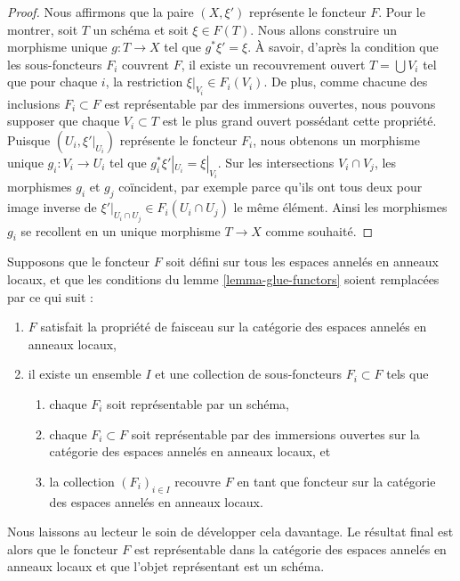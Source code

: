 \begin{proof}
\medskip\noindent
Nous affirmons que la paire $(X, \xi')$ représente le foncteur $F$. Pour
le montrer, soit $T$ un schéma et soit $\xi \in F(T)$. Nous
allons construire un morphisme unique $g : T \to X$ tel que $g^*\xi'
= \xi$. À savoir, d’après la condition que les sous-foncteurs $F_i$
couvrent $F$, il existe un recouvrement ouvert $T = \bigcup V_i$ tel que
pour chaque $i$, la restriction $\xi|_{V_i} \in F_i(V_i)$. De plus, comme
chacune des inclusions $F_i \subset F$ est représentable par des immersions ouvertes,
nous pouvons supposer que chaque $V_i \subset T$ est le plus grand ouvert
possédant cette propriété.
Puisque $(U_i, \xi'|_{U_i})$ représente le foncteur $F_i$, nous obtenons
un morphisme unique $g_i : V_i \to U_i$ tel que
$g_i^*\xi'|_{U_i} = \xi|_{V_i}$. Sur les intersections $V_i \cap V_j$, les
morphismes $g_i$ et $g_j$ coïncident, par exemple parce qu'ils ont tous deux
pour image inverse de $\xi'|_{U_i \cap U_j} \in F_i(U_i \cap
U_j)$ le même élément. Ainsi les morphismes $g_i$ se recollent en un unique morphisme
$T \to X$ comme souhaité.
\end{proof}

\begin{remark}
\label{remark-representable-locally-ringed}
Supposons que le foncteur $F$ soit défini sur tous les espaces annelés en anneaux
locaux, et que les conditions du lemme \ref{lemma-glue-functors} soient remplacées
par ce qui suit :
\begin{enumerate}
\item $F$ satisfait la propriété de faisceau sur la catégorie des espaces annelés en
anneaux
locaux, \item il existe un ensemble $I$ et une collection de sous-foncteurs
$F_i \subset F$ tels que
\begin{enumerate}
\item chaque $F_i$ soit représentable par un schéma, \item
chaque $F_i \subset F$ soit représentable par des immersions ouvertes sur
la catégorie des espaces annelés en anneaux locaux, et
\item la collection $(F_i)_{i \in I}$ recouvre $F$ en tant que
foncteur sur la catégorie des espaces annelés en anneaux locaux.
\end{enumerate}
\end{enumerate}
Nous laissons au lecteur le soin de développer cela davantage.
Le résultat final est alors que le foncteur $F$ est
représentable dans la catégorie des espaces annelés en anneaux
locaux et que l'objet représentant est un schéma.
\end{remark}



